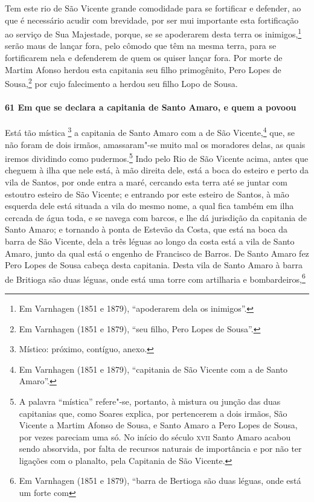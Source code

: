 \begin{linenumbers}
Tem este rio de São Vicente grande comodidade para se fortificar e defender, ao que é
necessário acudir com brevidade, por ser mui importante esta fortificação ao serviço de
Sua Majestade, porque, se se apoderarem desta terra os inimigos,\footnote{ Em Varnhagen
(1851 e 1879), ``apoderarem dela os inimigos''.} serão maus de lançar fora, pelo cômodo
que têm na mesma terra, para se fortificarem nela e defenderem de quem os quiser lançar
fora. Por morte de Martim Afonso herdou esta capitania seu filho primogênito, Pero Lopes
de Sousa,\footnote{ Em Varnhagen (1851 e 1879), ``seu filho, Pero Lopes de Sousa''.} por
cujo falecimento a herdou seu filho Lopo de Sousa.

\paragraph{61 Em que se declara a capitania de Santo Amaro, e quem a povoou} \quad
Está tão mística \footnote{ Místico: próximo, contíguo, anexo.} a capitania de Santo Amaro
com a de São Vicente,\footnote{ Em Varnhagen (1851 e 1879), ``capitania de São Vicente com
a de Santo Amaro''.} que, se não foram de dois irmãos, amassaram"-se muito mal os moradores
delas, as quais iremos dividindo como pudermos.\footnote{ A palavra ``mística'' refere"-se,
portanto, à mistura ou junção das duas capitanias que, como Soares explica, por
pertencerem a dois irmãos, São Vicente a Martim Afonso de Sousa, e Santo Amaro a Pero Lopes
de Sousa, por vezes pareciam uma só. No início do século \textsc{xvii} Santo Amaro acabou
sendo absorvida, por falta de recursos naturais de importância e por não ter ligações com
o planalto, pela Capitania de São Vicente.} Indo pelo Rio de São Vicente acima, antes que
cheguem à ilha que nele está, à mão direita dele, está a boca do esteiro e perto da vila
de Santos, por onde entra a maré, cercando esta terra até se juntar com estoutro esteiro
de São Vicente; e entrando por este esteiro de Santos, à mão esquerda dele está situada a
vila do mesmo nome, a qual fica também em ilha cercada de água toda, e se navega com
barcos, e lhe dá jurisdição da capitania de Santo Amaro; e tornando à ponta de Estevão da
Costa, que está na boca da barra de São Vicente, dela a três léguas ao longo da costa está
a vila de Santo Amaro, junto da qual está o engenho de Francisco de Barros. De Santo Amaro
fez Pero Lopes de Sousa cabeça desta capitania. Desta vila de Santo Amaro à barra de
Britioga são duas léguas, onde está uma torre com artilharia e bombardeiros,\footnote{ Em
Varnhagen (1851 e 1879), ``barra de Bertioga são duas léguas, onde está um forte com
}
\end{linenumbers}
